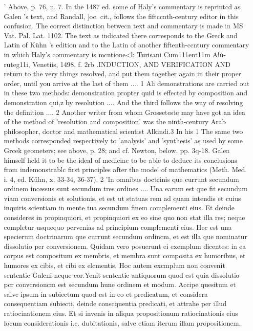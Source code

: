' Above, p. 76, n. 7. In the 1487 ed. some of Haly's commentary is reprintcd as Galen 's
text, and Randall, ]oc. cit., follows the fiftccnth-century editor in this confusion. The
correct distinction betwecn text and commentary is made in MS Vat. Pal. Lat. 1102.
The text as indicated there corresponds to the Greck and Latin of Kühn 's edition and to
the Latin of another fiftenth-ccntury commentary in which Haly's commentary is mcntione<l:
Turisani Cum111ent11m A!ù-ruteg11i, Venetiis, 1498, f. 2rb
.INDUCTION, AND VERIFICATION AND
return to the very things resolved, and put them together again in their
proper order, until you arrive at the last of them ....
1 Ali demonstrations
are carried out in these two methods: demonstration propter quid is effected
by composition and demonstration qui,z by resolution .... And the third
follows the way of resolving the definition ....
2
Another writer from whom Grosseteste may have got an idea of
the method of 'resolution and composition' was the ninth-century
Arab philosopher, doctor and mathematical scientist Alkindi.3 In his
1 The same two methods corresponded respectively to 'analysis' and 'synthesis' as
used by some Grcek geometers; see above, p. 28; and cf. Newton, below, pp. 3q-18.
Galen himself hcld it to be the ideal of mcdicinc to be able to dcducc its conclusions
from indemonstrablc first principles after the mode! of mathematics (Meth. Med. i. 4,
ed. Kühn, x. 33-34, 36-37).
2 'In omnibus doctrinis que currunt secundum ordinem incessus sunt secundum tres
ordines .... Una earum est que fit secundum viam conversionis et solutionis, et est ut
statuas rem ad quam intendis et cuius inquiris scientiam in mente tua secundum finem
complementi eius. Et deinde consideres in propinquiori, et propinquiori ex eo sine quo
non stat illa res; neque completur usquequo pcrvenias ad principium complcmenti eius.
Hec est una specierum doctrinarum que currunt secundum ordincm, et est illa que
nominatur dissolutio per conversionem. Quidam vero posuerunt ei exemplum dicentes:
in ea corpus est compositum ex membris, et membra sunt composita ex humoribus, et
humores ex cibis, et cibi ex elcmentis. Hoc autem excmplum non convenit sententie
Galcni neque cor.Yenit sententie antiquorum quod est quia dissolutio pcr convcrsioncm
est secundum hune ordinem et modum. Accipe quesitum et salve ipsum in subiectum
quod est in eo et predicatum, et considcra consequentiam subiecti, deinde conscquentia
predicati, et attrahe per illud ratiocinationem eius. Et si invenis in aliqua propositionum
ratiocinationis eius locum considerationis i.e. dubitationis, salve etiam iterum illam propositionem,
